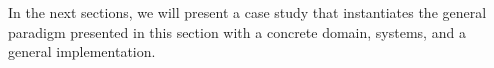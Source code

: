 In the next sections, we will present a case study that instantiates the general paradigm
presented in this section with a concrete domain, systems, and a general implementation. 



